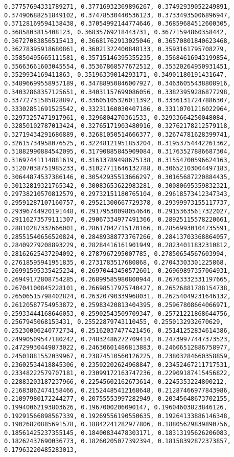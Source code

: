 \documentclass[11pt]{article}
\begin{document}
\begin{Verbatim}[commandchars=\\\{\}]
0.37757694331789271, 0.37716932369896267, 0.37492939052249891, 0.37490688251849102, 0.37478530440536123, 0.37334935006896947, 0.37128169594138438, 0.37054992144774646, 0.36859684512600305, 0.3685803815408123, 0.36835769218443731, 0.36771594860358442, 0.36727083856515413, 0.36681762913025046, 0.36570801840623468, 0.36278395918680861, 0.36021322400848133, 0.3593161795708279, 0.35850495665111581, 0.35715146395355235, 0.35684616943199854, 0.35663661603045554, 0.35367868577672512, 0.35320264950931451, 0.3529934169411863, 0.35196339014293171, 0.34901180191431647, 0.34896699558937189, 0.34788950846007927, 0.34636055438808916, 0.34032868357125651, 0.34031157699086056, 0.33823959286877298, 0.33772731585828897, 0.33605105326011392, 0.33361317247886307, 0.33302851691525542, 0.33231160030407186, 0.33110701216022964, 0.32973257471917961, 0.3296804270361533, 0.32933664250048084, 0.32850102787013424, 0.32765171903480916, 0.32762178212579118, 0.32719434291686889, 0.32681050514666377, 0.32674781628399741, 0.32615734958076525, 0.32248121951853204, 0.31953754442261362, 0.31882990884542095, 0.31790885845909084, 0.31763527886687304, 0.31697441114881619, 0.31613789498675138, 0.31554700596624163, 0.31207038751985233, 0.31027711646132788, 0.30652103004497183, 0.30644874537386146, 0.30542935513666297, 0.30165687220884435, 0.30132819321765342, 0.30083653622983281, 0.30080695359832321, 0.29738210570812579, 0.29732151180765104, 0.29618573412347343, 0.29591287107160757, 0.29521300667729378, 0.29399973155117737, 0.29396744920191448, 0.29179530098054646, 0.29153635617322027, 0.29116273579111307, 0.29067334977491366, 0.28925115578220661, 0.28810287332666001, 0.28617042715170166, 0.28569930104735591, 0.28551540656520824, 0.28489388773767266, 0.28413703368864057, 0.28409279208893229, 0.28284416161901949, 0.28234011832310812, 0.28162625437294092, 0.2787967295007785, 0.27850654567603994, 0.27618595941951835, 0.2731783517680868, 0.27043303301225868, 0.26991595335425234, 0.26970443450572601, 0.26969897357064931, 0.26949172808754285, 0.26899585980800944, 0.26763332331197665, 0.26704100845228101, 0.26698517975740427, 0.26526881788154738, 0.26506515798402824, 0.26320790339968031, 0.26254049231646132, 0.26120587754953872, 0.25983420813404395, 0.25967808664066971, 0.25933444168646053, 0.25902543509709347, 0.25721221868644756, 0.2567945068153431, 0.25522879743110455, 0.2550132932670629, 0.25230006240772734, 0.25162037477421456, 0.25141252834614386, 0.24990509547180242, 0.24832486272709414, 0.24739977447373523, 0.24729930449873022, 0.24630601486813883, 0.24606512886758977, 0.24501881552039967, 0.23874510560126225, 0.23803284660358859, 0.23602534418845306, 0.23592202624968847, 0.23452467211717531, 0.23348222579707181, 0.23099172163747236, 0.22909187415456822, 0.22883203187237966, 0.22545602162673614, 0.2245353224800212, 0.21683862474158466, 0.21524485412168648, 0.21287466977843986, 0.21097980172244277, 0.20755553997282949, 0.20345648673702155, 0.19940062193803626, 0.1967000206090147, 0.19604603823846126, 0.19291566898567339, 0.19269556190550635, 0.19264133886146348, 0.19026820885691578, 0.18842241282977806, 0.18805629839890756, 0.18561425237355145, 0.18400834478303171, 0.18313195626206083, 0.18262437690036773, 0.18260205077392394, 0.18158392872373857, 0.17963220485283013, 
\end{Verbatim}
\end{document}
